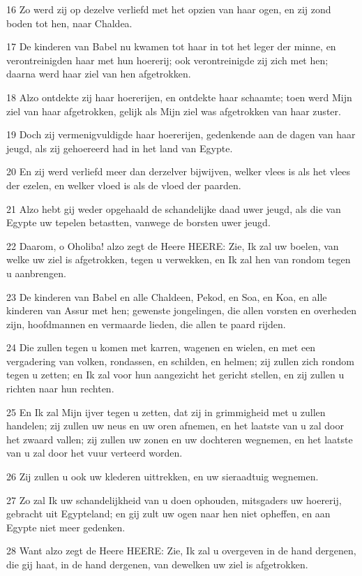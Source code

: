 \par 16 Zo werd zij op dezelve verliefd met het opzien van haar ogen, en zij zond boden tot hen, naar Chaldea.
\par 17 De kinderen van Babel nu kwamen tot haar in tot het leger der minne, en verontreinigden haar met hun hoererij; ook verontreinigde zij zich met hen; daarna werd haar ziel van hen afgetrokken.
\par 18 Alzo ontdekte zij haar hoererijen, en ontdekte haar schaamte; toen werd Mijn ziel van haar afgetrokken, gelijk als Mijn ziel was afgetrokken van haar zuster.
\par 19 Doch zij vermenigvuldigde haar hoererijen, gedenkende aan de dagen van haar jeugd, als zij gehoereerd had in het land van Egypte.
\par 20 En zij werd verliefd meer dan derzelver bijwijven, welker vlees is als het vlees der ezelen, en welker vloed is als de vloed der paarden.
\par 21 Alzo hebt gij weder opgehaald de schandelijke daad uwer jeugd, als die van Egypte uw tepelen betastten, vanwege de borsten uwer jeugd.
\par 22 Daarom, o Oholiba! alzo zegt de Heere HEERE: Zie, Ik zal uw boelen, van welke uw ziel is afgetrokken, tegen u verwekken, en Ik zal hen van rondom tegen u aanbrengen.
\par 23 De kinderen van Babel en alle Chaldeen, Pekod, en Soa, en Koa, en alle kinderen van Assur met hen; gewenste jongelingen, die allen vorsten en overheden zijn, hoofdmannen en vermaarde lieden, die allen te paard rijden.
\par 24 Die zullen tegen u komen met karren, wagenen en wielen, en met een vergadering van volken, rondassen, en schilden, en helmen; zij zullen zich rondom tegen u zetten; en Ik zal voor hun aangezicht het gericht stellen, en zij zullen u richten naar hun rechten.
\par 25 En Ik zal Mijn ijver tegen u zetten, dat zij in grimmigheid met u zullen handelen; zij zullen uw neus en uw oren afnemen, en het laatste van u zal door het zwaard vallen; zij zullen uw zonen en uw dochteren wegnemen, en het laatste van u zal door het vuur verteerd worden.
\par 26 Zij zullen u ook uw klederen uittrekken, en uw sieraadtuig wegnemen.
\par 27 Zo zal Ik uw schandelijkheid van u doen ophouden, mitsgaders uw hoererij, gebracht uit Egypteland; en gij zult uw ogen naar hen niet opheffen, en aan Egypte niet meer gedenken.
\par 28 Want alzo zegt de Heere HEERE: Zie, Ik zal u overgeven in de hand dergenen, die gij haat, in de hand dergenen, van dewelken uw ziel is afgetrokken.
